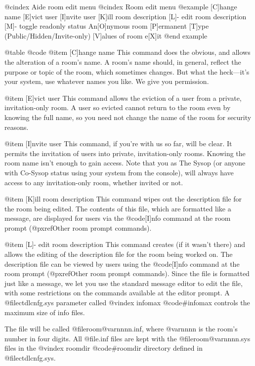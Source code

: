 @cindex Aide room edit menu
@cindex Room edit menu
@example
[C]hange name
[E]vict user
[I]nvite user
[K]ill room description
[L]- edit room description
[M]- toggle readonly status
An[O]nymous room	
[P]ermanent
[T]ype (Public/Hidden/Invite-only)
[V]alues of room
e[X]it
@end example

@table @code
@item [C]hange name
This command does the obvious, and allows the
alteration of a room's name.  A room's name should, in
general, reflect the purpose or topic of the room,
which sometimes changes.  But what the heck---it's
your system, use whatever names you like.  We give
you permission.

@item [E]vict user
This command allows the eviction of a user
from a private, invitation-only room.  A user so
evicted cannot return to the room even by knowing
the full name, so you need not change the name of the
room for security reasons.

@item [I]nvite user
This command, if you're with us so far, will
be clear.  It permits the invitation of users into
private, invitation-only rooms.  Knowing the room
name isn't enough to gain access.  Note that you as
The Sysop (or anyone with Co-Sysop status using your
system from the console), will always have access to
any invitation-only room, whether invited or not.

@item [K]ill room description
This command wipes out the description file for the room being edited.  The
contents of this file, which are formatted like a message, are displayed for
users via the @code{[I]nfo} command at the room prompt
(@pxref{Other room prompt commands}).

@item [L]- edit room description
This command creates (if it wasn't there) and allows the editing of the
description file for the room being worked on.  The description file can be
viewed by users using the @code{[I]nfo} command at the room prompt
(@pxref{Other room prompt commands}).  Since the file is formatted just like
a message, we let you use the standard message editor to edit the file, with
some restrictions on the commands available at the editor prompt.  A
@file{ctdlcnfg.sys} parameter called
@vindex infomax
@code{#infomax} controls the maximum size of info files.

The file will be called @file{room@var{nnnn}.inf}, where
@var{nnnn} is the room's number in four digits.  All @file{.inf}
files are kept with the @file{room@var{nnnn}.sys} files in the
@vindex roomdir
@code{#roomdir} directory defined in @file{ctdlcnfg.sys}.

